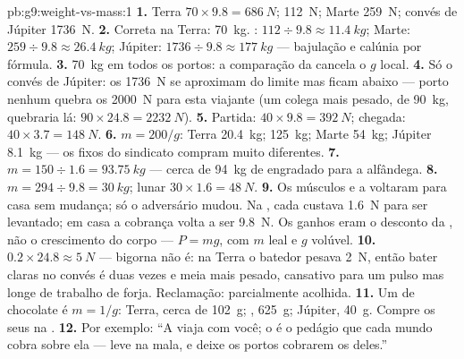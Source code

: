 \begin{solution}{pb:g9:weight-vs-mass:1}
\textbf{1.} Terra $70 \times 9.8 = \qty{686}{N}$;  \qty{112}{N};
Marte \qty{259}{N}; convés de Júpiter \qty{1736}{N}.
\textbf{2.} Correta na Terra: \qty{70}{kg}. :
$112 \div 9.8 \approx \qty{11.4}{kg}$; Marte:
$259 \div 9.8 \approx \qty{26.4}{kg}$; Júpiter:
$1736 \div 9.8 \approx \qty{177}{kg}$ --- bajulação e calúnia por
fórmula.
\textbf{3.} \qty{70}{kg} em todos os portos: a comparação da  cancela o $g$ local.
\textbf{4.} Só o convés de Júpiter: os \qty{1736}{N} se aproximam do
limite mas ficam abaixo --- porto nenhum quebra os \qty{2000}{N} para
esta viajante (um colega mais pesado, de \qty{90}{kg}, quebraria lá:
$90 \times 24.8 = \qty{2232}{N}$).
\textbf{5.} Partida: $40 \times 9.8 = \qty{392}{N}$; chegada:
$40 \times 3.7 = \qty{148}{N}$.
\textbf{6.} $m = 200/g$: Terra \qty{20.4}{kg};  \qty{125}{kg};
Marte \qty{54}{kg}; Júpiter \qty{8.1}{kg} --- os  fixos do
sindicato compram  muito diferentes.
\textbf{7.} $m = 150 \div 1.6 = \qty{93.75}{kg}$ --- cerca de
\qty{94}{kg} de engradado para a alfândega.
\textbf{8.} $m = 294 \div 9.8 = \qty{30}{kg}$;  lunar
$30 \times 1.6 = \qty{48}{N}$.
\textbf{9.} Os músculos e a  voltaram para casa sem mudança; só
o adversário mudou. Na , cada  custava \qty{1.6}{N} para
ser levantado; em casa a cobrança volta a ser \qty{9.8}{N}. Os ganhos
eram o desconto da , não o crescimento do corpo --- $P = m g$, com
$m$ leal e $g$ volúvel.
\textbf{10.} $0.2 \times 24.8 \approx \qty{5}{N}$ --- bigorna não é:
na Terra o batedor pesava \qty{2}{N}, então bater claras no convés é
duas vezes e meia mais pesado, cansativo para um pulso mas longe de
trabalho de forja. Reclamação: parcialmente acolhida.
\textbf{11.} Um  de chocolate é $m = 1/g$: Terra, cerca de
\qty{102}{g}; , \qty{625}{g}; Júpiter, \qty{40}{g}. Compre os seus
 na .
\textbf{12.} Por exemplo: ``A  viaja com você; o  é o
pedágio que cada mundo cobra sobre ela --- leve  na mala,
e deixe os portos cobrarem os  deles.''
\end{solution}
